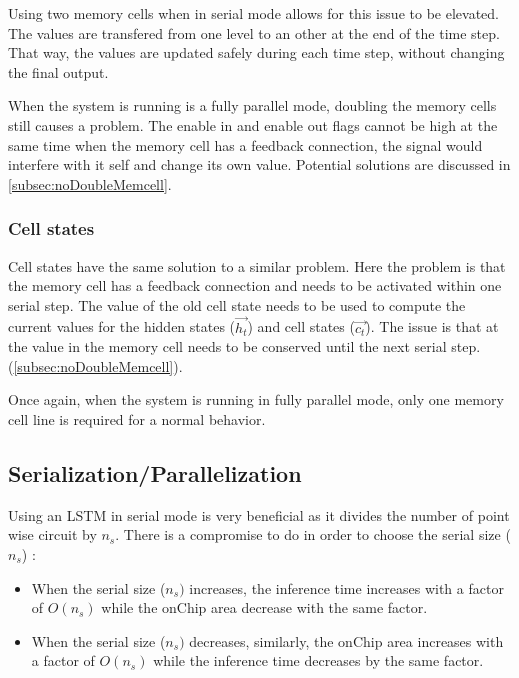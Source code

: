 Using two memory cells when in serial mode allows for this issue to be elevated. The values are transfered from one level to an other at the end of the time step. That way, the values are updated safely during each time step, without changing the final output.

When the system is running is a fully parallel mode, doubling the memory cells still causes a problem. The enable in and enable out flags cannot be high at the same time when the memory cell has a feedback connection, the signal would interfere with it self and change its own value. Potential solutions are discussed in \cref{subsec:noDoubleMemcell}.

\subsubsection{Cell states}

Cell states have the same solution to a similar problem. Here the problem is that the memory cell has a feedback connection and needs to be activated within one serial step. The value of the old cell state needs to be used to compute the current values for the hidden states ($\overrightarrow{h_t}$) and cell states ($\overrightarrow{c_t}$). The issue is that at the value in the memory cell needs to be conserved until the next serial step.  (\cref{subsec:noDoubleMemcell}).

Once again, when the system is running in fully parallel mode, only one memory cell line is required for a normal behavior.

\subsection{Serialization/Parallelization}
\label{subsec:serpar}

Using an \ac{LSTM} in serial mode is very beneficial as it divides the number of point wise circuit by $n_s$. There is a compromise to do in order to choose the serial size ($n_s$) :

\begin{itemize}
  \item When the serial size ($n_s)$ increases, the inference time increases with a factor of $O(n_s)$ while the onChip area decrease with the same factor.
  \item When the serial size ($n_s)$ decreases, similarly, the onChip area increases with a factor of $O(n_s)$ while the inference time decreases by the same factor.
\end{itemize}

